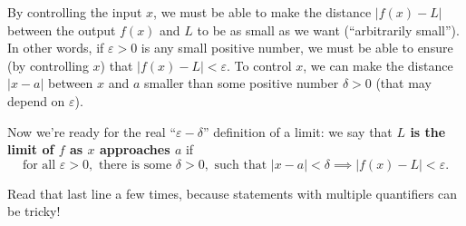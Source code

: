 \documentclass{article}
\theoremstyle{definition}
\theoremstyle{definition}
\begin{document}
By controlling the input $x$, we must be able to make the distance $|f(x)-L|$ between the output $f(x)$ and $L$ to be as small as we want (``arbitrarily small''). In other words, if $\varepsilon>0$ is any small positive number, we must be able to ensure (by controlling $x$) that $|f(x)-L| < \varepsilon$. To control $x$, we can make the distance $|x-a|$ between $x$ and $a$ smaller than some positive number $\delta > 0$ (that may depend on $\varepsilon$).

Now we're ready for the real ``$\varepsilon-\delta$'' definition of a limit: we say that \textbf{$L$ is the limit of $f$ as $x$ approaches $a$} if
$$\text{for all } \varepsilon > 0, \text{ there is some } \delta > 0, \text{ such that } |x - a| < \delta \implies |f(x) - L| <\varepsilon.$$

Read that last line a few times, because statements with multiple quantifiers can be tricky!
\end{document}
